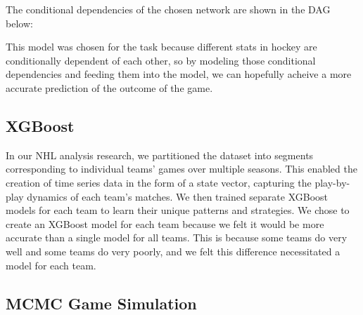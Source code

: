 \documentclass[11pt]{article}
\begin{document}
The conditional dependencies of the chosen network are shown in the DAG below:

\begin{center}
\end{center}

This model was chosen for the task because different stats in hockey are conditionally dependent of each other, so by modeling those conditional
dependencies and feeding them into the model, we can hopefully acheive a more accurate prediction of the outcome of the game.

\subsection{XGBoost}

In our NHL analysis research, we partitioned the dataset into segments 
corresponding to individual teams' games over multiple seasons. 
This enabled the creation of time series data in the form of a state vector, capturing the 
play-by-play dynamics of each team's matches. We then trained 
separate XGBoost models for each team to learn their unique patterns 
and strategies. We chose to create an XGBoost model for each team
because we felt it would be more accurate than a single model for all teams.
This is because some teams do very well and some teams do very poorly, and
we felt this difference necessitated a model for each team.


\subsection{MCMC Game Simulation}
\end{document}
